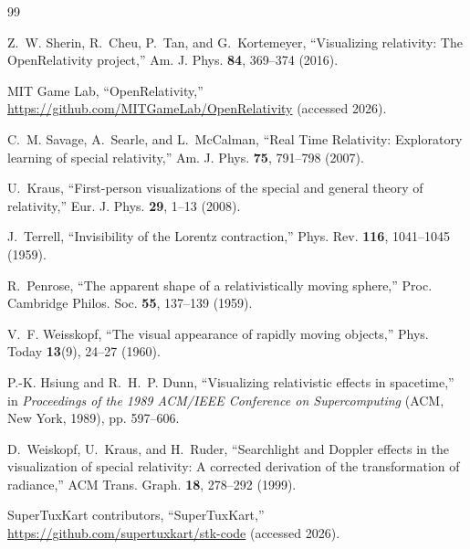 \documentclass[aip,amsmath,amssymb,reprint,nofootinbib]{revtex4-2}
\begin{document}
\begin{thebibliography}{99}

Z.~W. Sherin, R.~Cheu, P.~Tan, and G.~Kortemeyer,
``Visualizing relativity: The OpenRelativity project,''
Am. J. Phys. \textbf{84}, 369--374 (2016).

MIT Game Lab, ``OpenRelativity,''
\url{https://github.com/MITGameLab/OpenRelativity} (accessed 2026).

C.~M. Savage, A.~Searle, and L.~McCalman,
``Real Time Relativity: Exploratory learning of special relativity,''
Am. J. Phys. \textbf{75}, 791--798 (2007).

U.~Kraus,
``First-person visualizations of the special and general theory of relativity,''
Eur. J. Phys. \textbf{29}, 1--13 (2008).

J.~Terrell,
``Invisibility of the Lorentz contraction,''
Phys. Rev. \textbf{116}, 1041--1045 (1959).

R.~Penrose,
``The apparent shape of a relativistically moving sphere,''
Proc. Cambridge Philos. Soc. \textbf{55}, 137--139 (1959).

V.~F. Weisskopf,
``The visual appearance of rapidly moving objects,''
Phys. Today \textbf{13}(9), 24--27 (1960).

P.-K. Hsiung and R.~H.~P. Dunn,
``Visualizing relativistic effects in spacetime,''
in \emph{Proceedings of the 1989 ACM/IEEE Conference on Supercomputing}
(ACM, New York, 1989), pp. 597--606.

D.~Weiskopf, U.~Kraus, and H.~Ruder,
``Searchlight and Doppler effects in the visualization of special relativity:
A corrected derivation of the transformation of radiance,''
ACM Trans. Graph. \textbf{18}, 278--292 (1999).

SuperTuxKart contributors, ``SuperTuxKart,''
\url{https://github.com/supertuxkart/stk-code} (accessed 2026).

\end{thebibliography}
\end{document}
